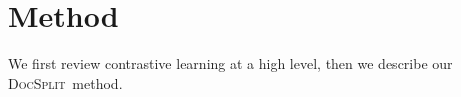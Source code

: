 \documentclass[11pt]{article}
\newcommand{\our}{\mbox{\textsc{DocSplit}}}
\begin{document}

\section{Method}

\label{sec:method}
We first review contrastive learning at a high level, then we describe our \our~method.

%
%
\end{document}
